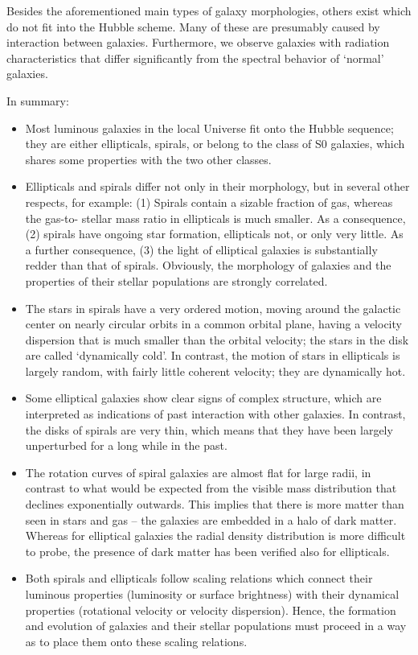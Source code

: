 \documentclass[a4paper,10pt]{article}
\begin{document}
{\noindent}Besides the aforementioned main types of galaxy morphologies, others exist which do not fit into the Hubble scheme. Many of these are presumably caused by interaction between galaxies. Furthermore, we observe galaxies with radiation characteristics that differ significantly from the spectral behavior of `normal' galaxies.

{\noindent}In summary:

\begin{itemize}
    \item Most luminous galaxies in the local Universe fit onto the Hubble sequence; they are either ellipticals, spirals, or belong to the class of S0 galaxies, which shares some properties with the two other classes.
    \item Ellipticals and spirals differ not only in their morphology, but in several other respects, for example: (1) Spirals contain a sizable fraction of gas, whereas the gas-to- stellar mass ratio in ellipticals is much smaller. As a consequence, (2) spirals have ongoing star formation, ellipticals not, or only very little. As a further consequence, (3) the light of elliptical galaxies is substantially redder than that of spirals. Obviously, the morphology of galaxies and the properties of their stellar populations are strongly correlated.
    \item The stars in spirals have a very ordered motion, moving around the galactic center on nearly circular orbits in a common orbital plane, having a velocity dispersion that is much smaller than the orbital velocity; the stars in the disk are called `dynamically cold'. In contrast, the motion of stars in ellipticals is largely random, with fairly little coherent velocity; they are dynamically hot.
    \item Some elliptical galaxies show clear signs of complex structure, which are interpreted as indications of past interaction with other galaxies. In contrast, the disks of spirals are very thin, which means that they have been largely unperturbed for a long while in the past.
    \item The rotation curves of spiral galaxies are almost flat for large radii, in contrast to what would be expected from the visible mass distribution that declines exponentially outwards. This implies that there is more matter than seen in stars and gas -- the galaxies are embedded in a halo of dark matter. Whereas for elliptical galaxies the radial density distribution is more difficult to probe, the presence of dark matter has been verified also for ellipticals.
    \item Both spirals and ellipticals follow scaling relations which connect their luminous properties (luminosity or surface brightness) with their dynamical properties (rotational velocity or velocity dispersion). Hence, the formation and evolution of galaxies and their stellar populations must proceed in a way as to place them onto these scaling relations.
\end{itemize}
\end{document}
